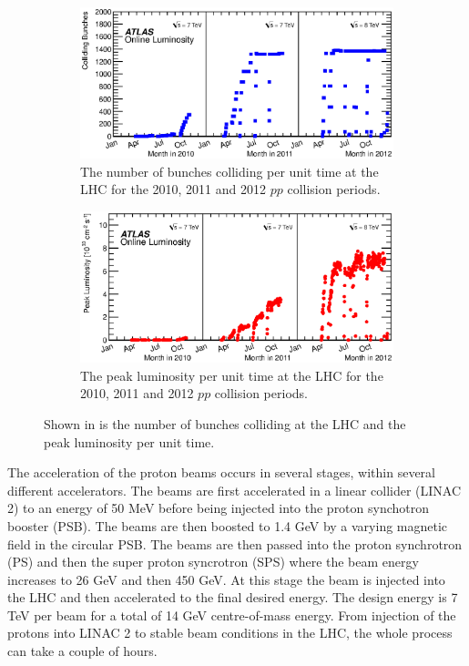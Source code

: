 \begin{figure}[tbhp]
  \centering
  \begin{subfigure}[b]{0.95\textwidth}
    \includegraphics[width=\textwidth]{PartDetector/Plots/BunchesCollidingPerTime.eps}
    \caption{The number of bunches colliding per unit time at the LHC for the 2010, 2011 and 2012 $pp$ collision periods.} \label{fig:DetectorBunchesColliding}
  \end{subfigure}
  
  \begin{subfigure}[b]{0.95\textwidth}
    \includegraphics[width=\textwidth]{PartDetector/Plots/PeakLuminosityVsTime.eps}
    \caption{The peak luminosity per unit time at the LHC for the 2010, 2011 and 2012 $pp$ collision periods.} \label{fig:DetectorPeakLumi}
  \end{subfigure}
  \caption{Shown in  is the number of bunches colliding at the LHC and  the peak luminosity per unit time.} \label{fig:DetectorPerformance}
\end{figure}

The acceleration of the proton beams occurs in several stages, within several different accelerators. The beams are first accelerated in a linear collider (LINAC 2) to an energy of 50 MeV before being injected into the proton synchotron booster (PSB). The beams are then boosted to 1.4 GeV by a varying magnetic field in the circular PSB. The beams are then passed into the proton synchrotron (PS) and then the super proton syncrotron (SPS) where the beam energy increases to 26 GeV and then 450 GeV. At this stage the beam is injected into the LHC and then accelerated to the final desired energy. The design energy is 7 TeV per beam for a total of 14 GeV centre-of-mass energy. From injection of the protons into LINAC 2 to stable beam conditions in the LHC, the whole process can take a couple of hours.

